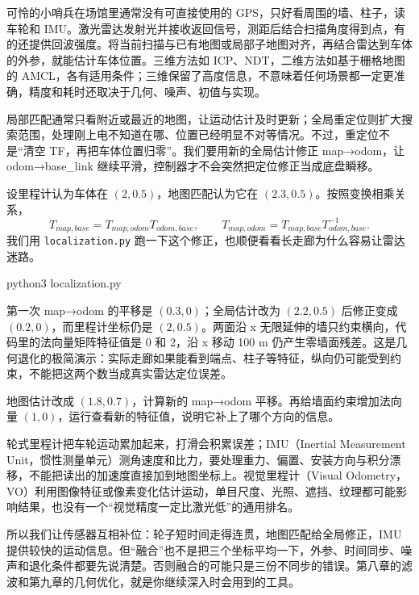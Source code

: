 可怜的小哨兵在场馆里通常没有可直接使用的 GPS，只好看周围的墙、柱子，读车轮和 IMU。激光雷达发射光并接收返回信号，测距后结合扫描角度得到点，有的还提供回波强度。将当前扫描与已有地图或局部子地图对齐，再结合雷达到车体的外参，就能估计车体位置。三维方法如 ICP、NDT，二维方法如基于栅格地图的 AMCL，各有适用条件；三维保留了高度信息，不意味着任何场景都一定更准确，精度和耗时还取决于几何、噪声、初值与实现。

局部匹配通常只看附近或最近的地图，让运动估计及时更新；全局重定位则扩大搜索范围，处理刚上电不知道在哪、位置已经明显不对等情况。不过，重定位不是“清空 TF，再把车体位置归零”。我们要用新的全局估计修正 map→odom，让 odom→base\_link 继续平滑，控制器才不会突然把定位修正当成底盘瞬移。

\begin{example}
设里程计认为车体在 $(2,0.5)$，地图匹配认为它在 $(2.3,0.5)$。按照变换相乘关系，
\[
T_{map,base}=T_{map,odom}T_{odom,base},\qquad
T_{map,odom}=T_{map,base}T_{odom,base}^{-1}.
\]
我们用 \texttt{localization.py} 跑一下这个修正，也顺便看看长走廊为什么容易让雷达迷路。

\begin{tbash}
python3 localization.py
\end{tbash}
第一次 map→odom 的平移是 $(0.3,0)$；全局估计改为 $(2.2,0.5)$ 后修正变成 $(0.2,0)$，而里程计坐标仍是 $(2,0.5)$。两面沿 x 无限延伸的墙只约束横向，代码里的法向量矩阵特征值是 0 和 2，沿 x 移动 100 m 仍产生零墙面残差。这是几何退化的极简演示：实际走廊如果能看到端点、柱子等特征，纵向仍可能受到约束，不能把这两个数当成真实雷达定位误差。
\end{example}
\begin{exercise}\label{ex:nav-localization}
地图估计改成 $(1.8,0.7)$，计算新的 map→odom 平移。再给墙面约束增加法向量 $(1,0)$，运行查看新的特征值，说明它补上了哪个方向的信息。
\end{exercise}

轮式里程计把车轮运动累加起来，打滑会积累误差；IMU（Inertial Measurement Unit，惯性测量单元）测角速度和比力，要处理重力、偏置、安装方向与积分漂移，不能把读出的加速度直接加到地图坐标上。视觉里程计（Visual Odometry，VO）利用图像特征或像素变化估计运动，单目尺度、光照、遮挡、纹理都可能影响结果，也没有一个“视觉精度一定比激光低”的通用排名。

所以我们让传感器互相补位：轮子短时间走得连贯，地图匹配给全局修正，IMU 提供较快的运动信息。但“融合”也不是把三个坐标平均一下，外参、时间同步、噪声和退化条件都要先说清楚。否则融合的可能只是三份不同步的错误。第八章的滤波和第九章的几何优化，就是你继续深入时会用到的工具。

